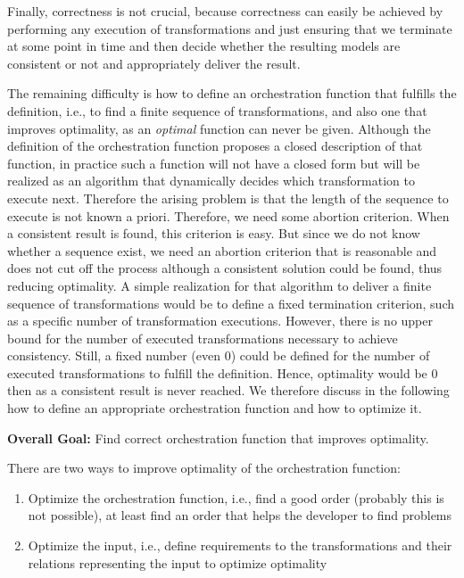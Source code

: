 Finally, correctness is not crucial, because correctness can easily be achieved by performing any execution of transformations and just ensuring that we terminate at some point in time and then decide whether the resulting models are consistent or not and appropriately deliver the result.

The remaining difficulty is how to define an orchestration function that fulfills the definition, i.e., to find a finite sequence of transformations, and also one that improves optimality, as an \emph{optimal} function can never be given.
Although the definition of the orchestration function proposes a closed description of that function, in practice such a function will not have a closed form but will be realized as an algorithm that dynamically decides which transformation to execute next.
Therefore the arising problem is that the length of the sequence to execute is not known a priori. Therefore, we need some abortion criterion. When a consistent result is found, this criterion is easy. But since we do not know whether a sequence exist, we need an abortion criterion that is reasonable and does not cut off the process although a consistent solution could be found, thus reducing optimality.
A simple realization for that algorithm to deliver a finite sequence of transformations would be to define a fixed termination criterion, such as a specific number of transformation executions. However, there is no upper bound for the number of executed transformations necessary to achieve consistency. Still, a fixed number (even 0) could be defined for the number of executed transformations to fulfill the definition. Hence, optimality would be 0 then as a consistent result is never reached. We therefore discuss in the following how to define an appropriate orchestration function and how to optimize it.

\textbf{Overall Goal:} Find correct orchestration function that improves optimality.

There are two ways to improve optimality of the orchestration function:
\begin{enumerate}
    \item Optimize the orchestration function, i.e., find a good order (probably this is not possible), at least find an order that helps the developer to find problems
    \item Optimize the input, i.e., define requirements to the transformations and their relations representing the input to optimize optimality
\end{enumerate}

